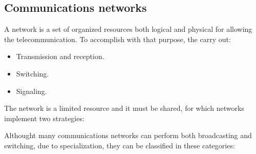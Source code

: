 \documentclass[../main.tex]{subfiles}
\begin{document}
\subsection{Communications networks}

A network is a set of organized resources both logical and physical for allowing the telecommunication. To accomplish with that purpose, the carry out:

\begin{itemize}
	\item Transmission and reception.
	\item Switching.
	\item Signaling.
\end{itemize}

The network is a limited resource and it must be shared, for which networks implement two strategies:


Althought many communications networks can perform both broadcasting and switching, due to specialization, they can be classified in these categories:
\end{document}

